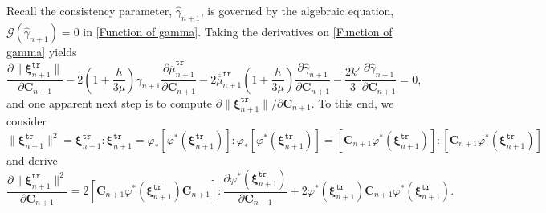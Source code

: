 \documentclass[preprint,11pt]{elsarticle}
\theoremstyle{definition}
\begin{document}
Recall the consistency parameter, $\widehat{\gamma}_{n+1}$, is governed by the algebraic equation, $\mathcal{G}(\widehat{\gamma}_{n+1}) = 0$ in \eqref{Function of gamma}. Taking the derivatives on \eqref{Function of gamma} yields
\begin{equation} \label{Partial gamma Partial C Initial}
    \dfrac{\partial \lVert \boldsymbol{\xi}_{n+1}^\texttt{tr} \rVert}{\partial \mathbf{C}_{n+1}}
    - 2 \left( 1 + \dfrac{h}{3\mu} \right) \widehat{\gamma}_{n+1}
    \dfrac{\partial \overline{\overline{\mu}}_{n+1}^\texttt{tr}}{\partial \mathbf{C}_{n+1}}
    - 2 \overline{\overline{\mu}}_{n+1}^\texttt{tr}
    \left( 1 + \dfrac{h}{3\mu} \right) \dfrac{\partial \widehat{\gamma}_{n+1}}{\partial \mathbf{C}_{n+1}}
    - \dfrac{2 k'}{3} \dfrac{\partial \widehat{\gamma}_{n+1}}{\partial \mathbf{C}_{n+1}} = 0,
\end{equation}
and one apparent next step is to compute $\partial \lVert \boldsymbol{\xi}_{n+1}^\texttt{tr} \rVert / \partial \mathbf{C}_{n+1}$. To this end, we consider
\begin{equation*}
    \lVert \boldsymbol{\xi}_{n+1}^\texttt{tr} \rVert^2 = \boldsymbol{\xi}_{n+1}^\texttt{tr}:\boldsymbol{\xi}_{n+1}^\texttt{tr}
    = \varphi_* \left[ \varphi^* (\boldsymbol{\xi}_{n+1}^\texttt{tr}) \right] : \varphi_* \left[ \varphi^* (\boldsymbol{\xi}_{n+1}^\texttt{tr}) \right]
    = \left[ \mathbf{C}_{n+1} \varphi^* (\boldsymbol{\xi}_{n+1}^\texttt{tr}) \right] : \left[ \mathbf{C}_{n+1} \varphi^* (\boldsymbol{\xi}_{n+1}^\texttt{tr}) \right]
\end{equation*}
and derive
\begin{equation} \label{Partial xi-trial-norm-square Partial C}
    \dfrac{\partial \lVert \boldsymbol{\xi}_{n+1}^\texttt{tr} \rVert^2}{\partial \mathbf{C}_{n+1}}
    = 2 \left[ \mathbf{C}_{n+1} \varphi^* (\boldsymbol{\xi}_{n+1}^\texttt{tr}) \mathbf{C}_{n+1} \right] : \dfrac{\partial \varphi^* (\boldsymbol{\xi}_{n+1}^\texttt{tr})}{\partial \mathbf{C}_{n+1}}
    + 2 \varphi^* (\boldsymbol{\xi}_{n+1}^\texttt{tr}) \mathbf{C}_{n+1} \varphi^* (\boldsymbol{\xi}_{n+1}^\texttt{tr}).
\end{equation}
\end{document}
